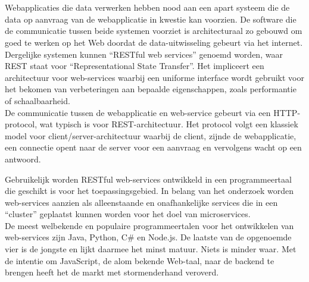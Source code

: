 
\chapter{}
\label{ch:inleiding}

\section{}
\label{sec:context}

Webapplicaties die data verwerken hebben nood aan een apart systeem die de data op aanvraag van de webapplicatie in kwestie kan voorzien. De software die de communicatie tussen beide systemen voorziet is architecturaal zo gebouwd om goed te werken op het Web doordat de data-uitwisseling gebeurt via het internet. \\
Dergelijke systemen kunnen “RESTful web services” genoemd worden, waar REST staat voor “Representational State Transfer”. Het impliceert een architectuur voor web-services waarbij een uniforme interface wordt gebruikt voor het bekomen van verbeteringen aan bepaalde eigenschappen, zoals performantie of schaalbaarheid. \\
De communicatie tussen de webapplicatie en web-service gebeurt via een \gls{HTTP}-protocol, wat typisch is voor \gls{REST}-architectuur. Het protocol volgt een klassiek model voor client/server-architectuur waarbij de client, zijnde de webapplicatie, een connectie opent naar de server voor een aanvraag en vervolgens wacht op een antwoord.

Gebruikelijk worden \gls{REST}ful web-services ontwikkeld in een programmeertaal die geschikt is voor het toepassingsgebied. In belang van het onderzoek worden web-services aanzien als alleenstaande en onafhankelijke services die in een ``cluster'' geplaatst kunnen worden voor het doel van microservices. \\
De meest welbekende en populaire programmeertalen voor het ontwikkelen van web-services zijn Java, Python, C\# en Node.js. De laatste van de opgenoemde vier is de jongste en lijkt daarmee het minst matuur. Niets is minder waar. Met de intentie om JavaScript, de alom bekende Web-taal, naar de backend te brengen heeft het de markt met stormenderhand veroverd.

